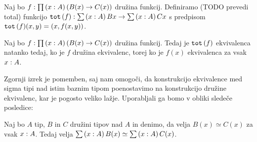 \begin{definicija}
  Naj bo \(f : \prod \left( x : A \right) \left(B(x) \to C(x)\right)\) družina funkcij.
  Definiramo (TODO prevedi total) funkcijo
  \(\textnormal{\texttt{tot}}\,(f) : \sum \left( x : A \right) Bx \to \sum \left( x : A \right) Cx\) s predpisom
  \(\textnormal{\texttt{tot}}\,(f)(x, y) = (x, f(x, y))\).
\end{definicija}

\begin{izrek}
  Naj bo \(f : \prod \left( x : A \right) \left(B(x) \to C(x)\right)\) družina funkcij.
  Tedaj je \(\textnormal{\texttt{tot}}\,(f)\) ekvivalenca natanko tedaj, ko je \(f\) družina ekvivalenc, torej
  ko je \(f(x)\) ekvivalenca za vsak \(x : A\).
\end{izrek}

Zgornji izrek je pomemben, saj nam omogoči, da konstrukcijo ekvivalence med sigma tipi
nad istim baznim tipom poenostavimo na konstrukcijo družine ekvivalenc, kar je pogosto
veliko lažje. Uporabljali ga bomo v obliki sledeče posledice:

\begin{posledica}
  \label{equiv-tot}
  Naj bo \(A\) tip, \(B\) in \(C\) družini tipov nad \(A\) in denimo, da velja
  \(B(x) \simeq C(x)\) za vsak \(x : A\).
  Tedaj velja \(\sum \left( x : A \right) B(x) \simeq \sum \left( x : A \right) C(x)\).
\end{posledica}

